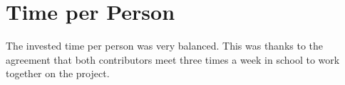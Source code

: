 \section{Time per Person}
\noindent\begin{minipage}[t]{0.48\linewidth}
    \vspace{0pt}
    The invested time per person was very balanced. This was thanks to the agreement that both contributors meet three times a week in school to work together on the project. 
\end{minipage}
\hfill
\begin{minipage}[t]{0.48\linewidth}
    \vspace{-18pt}
    \begin{table}[H]
    \centering
        \caption{Time for each contributor for each sprint}
        \label{time_per_contributork}
    \end{table}
\end{minipage}